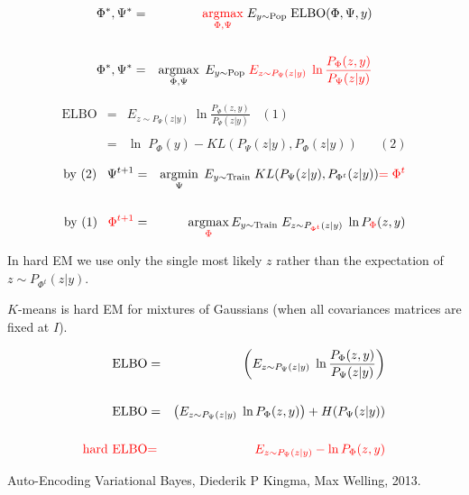 {\begin{eqnarray*}
\Phi^*, \Psi^* & = & {\color{red} \operatorname*{argmax}_{\Phi,\Psi}}\; E_{y \sim \mathrm{Pop}}\;\mathrm{ELBO}(\Phi,\Psi,y) \\
\\
\Phi^*, \Psi^* & = & \operatorname*{argmax}_{\Phi,\Psi}\;E_{y \sim \mathrm{Pop}}\;{\color{red} E_{z \sim P_\Psi(z|y)}\;\ln \frac{P_\Phi(z,y)}{P_\Psi(z|y)}}
\end{eqnarray*}


\begin{eqnarray*}
\mathrm{ELBO} & = & E_{z \sim P_\Psi(z|y)}\; \ln \frac{P_\Phi(z,y)}{P_\Psi(z|y)}\;\;\;(1) \\
 \\      
  & = &\ln\;P_{\Phi}(y) - KL(P_\Psi(z|y),P_{\Phi}(z|y))\;\;\;\;\;\;(2)
  \end{eqnarray*}

\vfill
\begin{eqnarray*}
\mbox{by (2)}\;\;\;\Psi^{t+1} & = & \operatorname*{argmin}_\Psi \;E_{y \sim \mathrm{Train}} \; KL(P_{\Psi}(z|y),P_{\Phi^t}(z|y)) {\color{red} = \Phi^t} \\
\\
\mbox{by (1)}\;\;\;{\color{red} \Phi^{t+1}} & = & \operatorname*{argmax}_{\color{red} \Phi} E_{y \sim \mathrm{Train}} \;E_{z \sim P_{\color{red} {\Phi^t}}(z|y)}\; \ln P_{\color{red} \Phi}(z,y)
\end{eqnarray*}

\vfill
In hard EM we use only the single most likely $z$ rather than the expectation of $z \sim P_{\Phi^t}(z|y)$.

\vfill
$K$-means is hard EM for mixtures of Gaussians (when all covariances matrices are fixed at $I$).

\begin{eqnarray*}
\mathrm{ELBO} & = & \left(E_{z\sim P_\Psi(z|y)} \;\ln \frac{P_\Phi(z,y)}{P_\Psi(z|y)}\right) \\
\\
\mbox{ELBO} & = & \left(E_{z\sim P_\Psi(z|y)} \;\ln P_\Phi(z,y)\right) + H(P_\Psi(z|y)) \\
\\
{\color{red} \mbox{hard ELBO}} & {\color{red}  =} & {\color{red}  E_{z \sim P_\Psi(z|y)} - \ln P_\Phi(z,y)}
\end{eqnarray*}


Auto-Encoding Variational Bayes, Diederik P Kingma, Max Welling, 2013.

}
